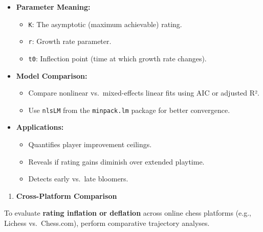 \documentclass[
]{article}
\providecommand{\tightlist}{%
  \setlength{\itemsep}{0pt}\setlength{\parskip}{0pt}}
\begin{document}
\begin{itemize}
\item
  \textbf{Parameter Meaning:}

  \begin{itemize}
  \tightlist
  \item
    \texttt{K}: The asymptotic (maximum achievable) rating.
  \item
    \texttt{r}: Growth rate parameter.
  \item
    \texttt{t0}: Inflection point (time at which growth rate changes).
  \end{itemize}
\item
  \textbf{Model Comparison:}

  \begin{itemize}
  \tightlist
  \item
    Compare nonlinear vs.~mixed-effects linear fits using AIC or
    adjusted R².
  \item
    Use \texttt{nlsLM} from the \texttt{minpack.lm} package for better
    convergence.
  \end{itemize}
\item
  \textbf{Applications:}

  \begin{itemize}
  \tightlist
  \item
    Quantifies player improvement ceilings.
  \item
    Reveals if rating gains diminish over extended playtime.
  \item
    Detects early vs.~late bloomers.
  \end{itemize}
\end{itemize}

\begin{enumerate}
\def\labelenumi{\arabic{enumi}.}
\tightlist
\item
  \textbf{Cross-Platform Comparison}
\end{enumerate}

To evaluate \textbf{rating inflation or deflation} across online chess
platforms (e.g., Lichess vs.~Chess.com), perform comparative trajectory
analyses.
\end{document}
